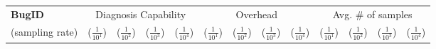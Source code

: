 \begin{table}[h!]
  \centering
  \scriptsize
  \newcommand{\Yes}[1]{\checkmark{}$_#1$}
  \newcommand{\No}[0]{-}
  \begin{tabular}{lcccccccccccc}
    \toprule  
     {\bf BugID} & \multicolumn{4}{c}{ Diagnosis Capability} &\multicolumn{4}{c}{Overhead} & \multicolumn{4}{c}{Avg. \# of samples} \\
                           
    \cmidrule(lr){2-5}
    \cmidrule(lr){6-9}
    \cmidrule(lr){10-13}
    (sampling rate)  &($\frac{1}{10^1}$)&($\frac{1}{10^2}$)&($\frac{1}{10^3}$)& ($\frac{1}{10^4}$)  &($\frac{1}{10^1}$) &($\frac{1}{10^2}$)&($\frac{1}{10^3}$)  & ($\frac{1}{10^4}$)  & ($\frac{1}{10^1}$)  & ($\frac{1}{10^2}$)    & ($\frac{1}{10^3}$)   &  ($\frac{1}{10^4}$) \\
    \midrule 


\end{tabular}
\end{table}
